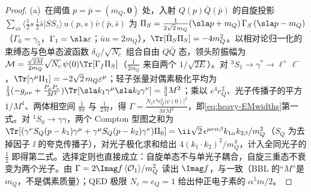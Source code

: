 \begin{proof}
(a)~在阈值 $p=\bar p=(m_Q,\bm0)$ 处，入射 $Q(p)\bar Q(\bar p)$ 的自旋投影 $\sum_{s\bar s}\langle\frac12s\,\frac12\bar s|SS_z\rangle\,u(p,s)\bar v(\bar p,\bar s)$ 为
$\Pi_S=\frac{1}{2\sqrt2\,m_Q}(\sla p+m_Q)\,\Gamma_S\,(\sla p-m_Q)$（$\Gamma_0=\gamma_5$，$\Gamma_1=\sla\varepsilon$；$\bar uu=2m_Q$），$\Tr[\bar\Pi_S\Pi_S]=-4m_Q^2$。以相对论归一化的束缚态与色单态波函数 $\delta_{ij}/\sqrt{N_c}$ 组合自由 $Q\bar Q$ 态，领头阶振幅为 $\mathcal M=\frac{\sqrt{2M}}{2m_Q}\sqrt{N_c}\,\psi(0)\Tr[\Gamma_f\Pi_S]$（$\frac{1}{2m_Q}$ 来自两个 $1/\sqrt{2E}$）。对 ${}^3S_1\to\gamma^*\to\ell^+\ell^-$，$\Tr[\gamma^\mu\Pi_1]=-2\sqrt2\,m_Q\varepsilon^\mu$；轻子张量对偶素极化平均为 $\frac13(-g_{\mu\nu}+\frac{P_\mu P_\nu}{M^2})\Tr[\sla k_1\gamma^\mu\sla k_2\gamma^\nu]=\frac43M^2$；乘以 $e^4e_Q^2$、光子传播子的平方 $1/M^4$、两体相空间 $\frac1{8\pi}$ 与 $\frac{1}{2M}$，得 $\Gamma=\frac{N_ce^4e_Q^2|\psi(0)|^2}{3\pi M^2}$，即\cref{eq:heavy-EMwidths}第一式。对 ${}^1S_0\to\gamma\gamma$，两个 Compton 型图之和为 $\Tr[(\gamma^\nu S_Q(p-k_1)\gamma^\mu+\gamma^\mu S_Q(p-k_2)\gamma^\nu)\Pi_0]=\ii\sqrt2\,\epsilon^{\mu\nu\alpha\beta}k_{1\alpha}k_{2\beta}/m_Q^2$（$S_Q$ 为去掉因子 $\ii$ 的夸克传播子），对光子极化求和给出 $4(k_1\cdot k_2)^2/m_Q^4$，计入全同光子的 $\frac12$ 即得第二式。选择定则也直接成立：自旋单态不与单光子耦合，自旋三重态不衰变为两个光子。由 $\Gamma=2\Imag f\,\langle\mathcal O_1\rangle/m_Q^2$ 读出 $\Imag f$，与\cite[式~(A31)、(A34)]{BodwinBraatenLepage1995}一致（BBL 的“$M$”是 $m_Q$，不是偶素质量）；QED 极限 $N_c=e_Q=1$ 给出仲正电子素的 $\alpha^5m/2$。


\end{proof}
